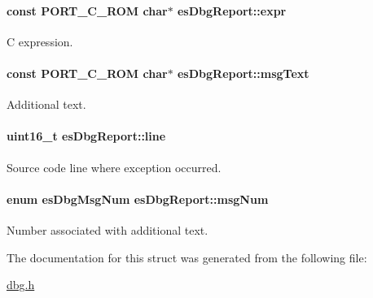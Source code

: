 \hypertarget{structesDbgReport_ae672502f0fa16e09179393ea42b096bc}{
\paragraph[{expr}]{\setlength{\rightskip}{0pt plus 5cm}const P\-O\-R\-T\-\_\-\-C\-\_\-\-R\-O\-M char$\ast$ es\-Dbg\-Report\-::expr}}\label{structesDbgReport_ae672502f0fa16e09179393ea42b096bc}


C expression. 

\hypertarget{structesDbgReport_a24a9b1bfc91e4dba26b8f8c2b0d9debb}{
\paragraph[{msg\-Text}]{\setlength{\rightskip}{0pt plus 5cm}const P\-O\-R\-T\-\_\-\-C\-\_\-\-R\-O\-M char$\ast$ es\-Dbg\-Report\-::msg\-Text}}\label{structesDbgReport_a24a9b1bfc91e4dba26b8f8c2b0d9debb}


Additional text. 

\hypertarget{structesDbgReport_a98cc5a9cbc3df997fa991aa2fa7cf8f0}{
\paragraph[{line}]{\setlength{\rightskip}{0pt plus 5cm}uint16\-\_\-t es\-Dbg\-Report\-::line}}\label{structesDbgReport_a98cc5a9cbc3df997fa991aa2fa7cf8f0}


Source code line where exception occurred. 

\hypertarget{structesDbgReport_a4f414a29ac5524b5d6ed12bf83189f1d}{
\paragraph[{msg\-Num}]{\setlength{\rightskip}{0pt plus 5cm}enum {\bf es\-Dbg\-Msg\-Num} es\-Dbg\-Report\-::msg\-Num}}\label{structesDbgReport_a4f414a29ac5524b5d6ed12bf83189f1d}


Number associated with additional text. 



The documentation for this struct was generated from the following file\-:\begin{DoxyCompactItemize}
\item 
\hyperlink{dbg_8h}{dbg.\-h}\end{DoxyCompactItemize}
